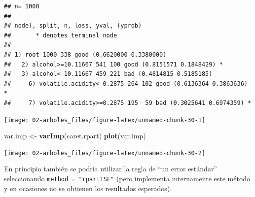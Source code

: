 \documentclass[]{book}
\newenvironment{Shaded}{\begin{snugshade}}{\end{snugshade}}
\newcommand{\KeywordTok}[1]{\textcolor[rgb]{0.13,0.29,0.53}{\textbf{#1}}}
\newcommand{\DataTypeTok}[1]{\textcolor[rgb]{0.13,0.29,0.53}{#1}}
\newcommand{\DecValTok}[1]{\textcolor[rgb]{0.00,0.00,0.81}{#1}}
\newcommand{\StringTok}[1]{\textcolor[rgb]{0.31,0.60,0.02}{#1}}
\newcommand{\CommentTok}[1]{\textcolor[rgb]{0.56,0.35,0.01}{\textit{#1}}}
\newcommand{\OperatorTok}[1]{\textcolor[rgb]{0.81,0.36,0.00}{\textbf{#1}}}
\newcommand{\NormalTok}[1]{#1}
\theoremstyle{break}
\theoremstyle{definition}
\theoremstyle{definition}
\theoremstyle{definition}
\theoremstyle{remark}
\begin{document}
\begin{Shaded}
\end{Shaded}

\begin{verbatim}
## n= 1000 
## 
## node), split, n, loss, yval, (yprob)
##       * denotes terminal node
## 
## 1) root 1000 338 good (0.6620000 0.3380000)  
##   2) alcohol>=10.11667 541 100 good (0.8151571 0.1848429) *
##   3) alcohol< 10.11667 459 221 bad (0.4814815 0.5185185)  
##     6) volatile.acidity< 0.2875 264 102 good (0.6136364 0.3863636) *
##     7) volatile.acidity>=0.2875 195  59 bad (0.3025641 0.6974359) *
\end{verbatim}

\begin{Shaded}
\end{Shaded}

\begin{center}\texttt{[image: 02-arboles\_files/figure-latex/unnamed-chunk-30-1]} \end{center}

\begin{Shaded}
\begin{Highlighting}[]
\NormalTok{var.imp <-}\StringTok{ }\KeywordTok{varImp}\NormalTok{(caret.rpart)}
\KeywordTok{plot}\NormalTok{(var.imp)}
\end{Highlighting}
\end{Shaded}

\begin{center}\texttt{[image: 02-arboles\_files/figure-latex/unnamed-chunk-30-2]} \end{center}

En principio también se podría utilizar la regla de ``un error
estándar'' seleccionando \texttt{method\ =\ "rpart1SE"} (pero implementa
internamente este método y en ocasiones no se obtienen los resultados
esperados).

\begin{Shaded}
\end{Shaded}
\end{document}
